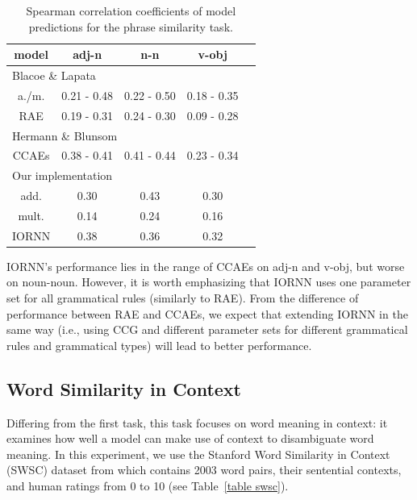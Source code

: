 \documentclass[11pt]{article}
\begin{document}
\begin{table}[h!]
	\center
	\begin{tabular}{ccccc}
		\hline
		model & adj-n & n-n & v-obj \\ \hline \hline
		
		\multicolumn{4}{l}{Blacoe \& Lapata} & \\
		a./m. & 0.21 - 0.48 & 0.22 - 0.50 & 0.18 - 0.35 \\ 
		RAE & 0.19 - 0.31 & 0.24 - 0.30 & 0.09 - 0.28 \\ \hline 
		
		\multicolumn{4}{l}{Hermann \& Blunsom} & \\
		CCAEs & 0.38 - 0.41 & 0.41 - 0.44 & 0.23 - 0.34 \\ \hline 
			
		\multicolumn{4}{l}{Our implementation} & \\
		add. & 0.30 & 0.43 & 0.30 \\ 
		mult. & 0.14 & 0.24 & 0.16 \\ 
		IORNN & 0.38 & 0.36 & 0.32 \\ \hline
	\end{tabular}
	\caption{Spearman correlation coefficients of model predictions for the phrase similarity task.}
	\label{table hermann}
\end{table}

IORNN's performance lies in the range of CCAEs on adj-n and v-obj, 
but worse on noun-noun. However, it is worth emphasizing that IORNN uses one 
parameter set for all grammatical rules (similarly to RAE). 
From the difference of performance between RAE and CCAEs, we expect that extending 
IORNN in the same way (i.e., using CCG and different parameter sets for different 
grammatical rules and grammatical types) will lead to better performance.


\subsection{Word Similarity in Context}
\label{subsection wsc} 

Differing from the first task, this task focuses on word meaning in context: 
it examines how well a model can make use of context to disambiguate word meaning. 
In this experiment, we use the Stanford Word Similarity in Context (SWSC) dataset
from \cite{huang2012improving} which contains 2003 word pairs, their sentential 
contexts, and human ratings from 0 to 10 (see Table~\ref{table swsc}).
\end{document}
